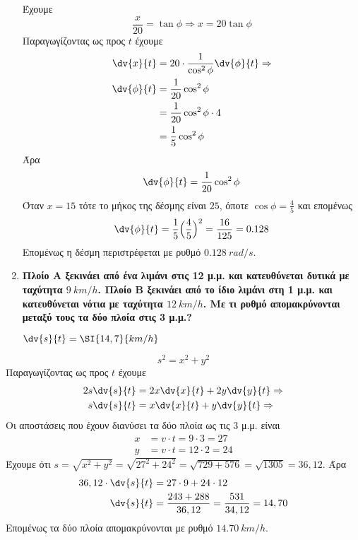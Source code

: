 \begin{enumerate}
    Έχουμε
    \[
      \frac{x}{20}=\tan\phi \Rightarrow x=20\tan\phi
    \]
    Παραγωγίζοντας ως προς $t$ έχουμε
    \begin{align*}
      \dv{x}{t} &= 20\cdot \frac{1}{\cos^{2}\phi}\dv{\phi}{t} \notag \Rightarrow \\
      \dv{\phi}{t}&=\frac{1}{20}\cos^{2}\phi \\
                  &=\frac{1}{20}\cos^{2}\phi\cdot 4 \\
                  &=\frac{1}{5}\cos^{2}\phi
    \end{align*}
    Άρα
    \begin{equation} \label{eq:anglerate}
      \dv{\phi}{t}=\frac{1}{20}\cos^{2}\phi
    \end{equation}
    Όταν $x=15$ τότε το μήκος της δέσμης είναι $25$, όποτε $\cos\phi = \frac{4}{5}$ και 
    επομένως
    \[
      \dv{\phi}{t} = \frac{1}{5}\Bigl(\frac{4}{5}\Bigr)^{2} = \frac{16}{125} = 0.128
    \]
    Επομένως η δέσμη περιστρέφεται με ρυθμό $\SI{0.128}{rad/s}$.


  \item {\bfseries \boldmath Πλοίο Α ξεκινάει από ένα λιμάνι στις 12 μ.μ. και 
      κατευθύνεται δυτικά
      με ταχύτητα  $\SI{9}{km/h}$. Πλοίο Β ξεκινάει από το ίδιο λιμάνι στη 1
      μ.μ. και κατευθύνεται νότια με ταχύτητα $\SI{12}{km/h}$. Με τι ρυθμό
    απομακρύνονται μεταξύ τους τα δύο πλοία στις 3 μ.μ.?}

    \hfill $ \dv{s}{t} = \SI{14,7}{km/h} $
\end{enumerate}



\[
  s^{2} = x^{2} + y^{2}
\]
Παραγωγίζοντας ως προς $t$ έχουμε
\begin{align*}
  2s \dv{s}{t} & = 2x\dv{x}{t} + 2y\dv{y}{t} \Rightarrow \\
  s \dv{s}{t} & = x\dv{x}{t} + y\dv{y}{t} \Rightarrow \\
\end{align*}
Οι αποστάσεις που έχουν διανύσει τα δύο πλοία ως τις $3$ μ.μ. είναι
\begin{align*}
  x &= v\cdot t = 9 \cdot 3 = 27 \\
  y &= v\cdot t = 12 \cdot 2 = 24
\end{align*}
Έχουμε ότι $ s = \sqrt{x^{2} + y^{2}} = \sqrt{27^{2} + 24^{2}} =
\sqrt{729 + 576} = \sqrt{1305} = 36,12$.
Άρα 
\begin{align}
  36,12 \cdot \dv{s}{t} &= 27\cdot 9 + 24 \cdot 12 \\
  \dv{s}{t} &= \frac{243 + 288}{36,12} = \frac{531}{34,12} = 14,70
\end{align}
Επομένως τα δύο πλοία απομακρύνονται με ρυθμό $\SI{14,70}{km/h}$.







